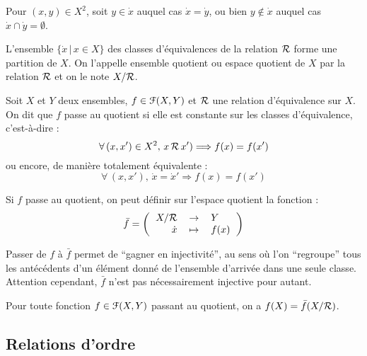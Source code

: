 		 Pour \((x,y) \in X^2\), soit \(y \in \dot{x}\) auquel cas \(\dot{x} = \dot{y}\), ou bien \(y \notin \dot{x}\) auquel cas \(\dot{x} \cap \dot{y} = \emptyset\).
		
		\begin{Corollaire} L'ensemble \(\{\dot{x} \,|\, x \in X\}\) des classes d'équivalences de la relation \(\cal{R}\) forme une partition de \(X\). On l'appelle ensemble quotient ou espace quotient de \(X\) par la relation \(\cal{R}\) et on le note \(X/\cal{R}\).
		\end{Corollaire}
		
		\eqskip{2mm}
		\begin{Definition}
			Soit \(X\) et \(Y\) deux ensembles, \(f \in \escr{F}(X,Y)\) et \(\cal{R}\) une relation d'équivalence sur \(X\). \\
			On dit que \(f\) passe au quotient si elle est constante sur les classes d'équivalence, c'est-à-dire :
				\[
					\forall \,(x,x') \in X^2, \,x \,\cal{R}\, x' \text{)} \Longrightarrow f(x) = f(x')
				\]
			ou encore, de manière totalement équivalente :
				\[
					\forall \,(x,x'),\,\dot{x} = \dot{x}' \Longrightarrow f(x) = f(x')
				\]
			
			\eqskip{3mm}
			\setlength{\tabcolsep}{2.2pt}
			Si \(f\) passe au quotient, on peut définir sur l'espace quotient la fonction :
				\[
					\bar{f} =
					\left( \begin{tabular}[h]{rcl}
					\(X/\cal{R}\) & \(\rightarrow\) &\(Y\) \\
					\(\dot{x}\) & \(\mapsto\) & \(f(x)\)
					\end{tabular} \right)
				\]
		\end{Definition}
		
		\begin{Remarque}
			Passer de \(f\) à \(\bar{f}\) permet de ``gagner en injectivité'', au sens où l'on ``regroupe'' tous les antécédents d'un élément donné de l'ensemble d'arrivée dans une seule classe. Attention cependant, \(\bar{f}\) n'est pas nécessairement injective pour autant.
		\end{Remarque}
		
		 Pour toute fonction \(f \in \escr{F}(X,Y)\) passant au quotient, on a \(f(X) = \bar{f}(X/\cal{R})\).
		
	
	\subsection{Relations d'ordre}
		
